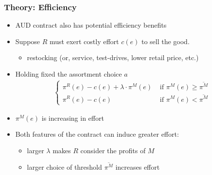 \documentclass[aspectratio=169,11pt]{beamer}
\begin{document}

\begin{frame}
\frametitle{Theory: Efficiency}
\begin{itemize}
\item AUD contract also has potential efficiency benefits
\item Suppose $R$ must exert costly effort $c(e)$ to sell the good.
\begin{itemize}
\item restocking (or, service, test-drives, lower retail price, etc.)
\end{itemize}
\item Holding fixed the assortment choice $a$
\begin{eqnarray*}
\label{effortchoice}
\begin{cases}
 \pi^R(e) -c(e) + \lambda \cdot \pi^M(e) &\mbox{ if } \pi^M(e) \geq \overline{\pi^M}\\
 \pi^R(e)  -c(e)   &\mbox{ if } \pi^M(e) < \overline{\pi^M}
\end{cases}
\end{eqnarray*}
\item $\pi^M(e)$ is increasing in effort
\item Both features of the contract can induce greater effort: 
\begin{itemize}
\item larger $\lambda$ makes $R$ consider the profits of $M$
\item larger choice of threshold $\overline{\pi^M}$ increases effort
\end{itemize}
\end{itemize}
\end{frame}
\end{document}
